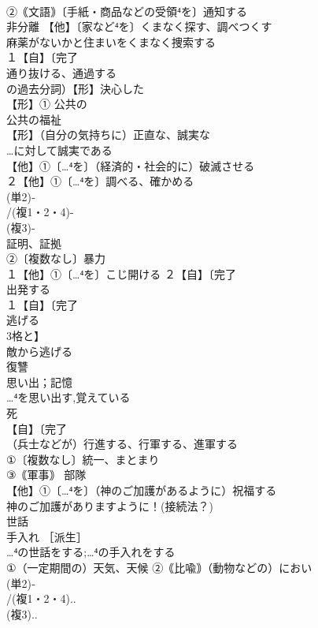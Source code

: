 \documentclass[8pt]{extreport}
\begin{document}
\begin{CJK}{UTF8}{min}
\\	②｟文語｠〔手紙・商品などの受領⁴を〕通知する
\\	非分離 【他】〔家など⁴を〕くまなく探す、調べつくす 
\\	麻薬がないかと住まいをくまなく捜索する
\\	１【自】〔完了
\\	通り抜ける、通過する 
\\	の過去分詞）【形】決心した
\\	【形】① 公共の 
\\	公共の福祉
\\	【形】（自分の気持ちに）正直な、誠実な 
\\	…に対して誠実である 
\\	【他】①〔…⁴を〕（経済的・社会的に）破滅させる 
\\	２【他】①〔…⁴を〕調べる、確かめる
\\	(単2)‐
\\	/(複1・2・4)-
\\	(複3)-
\\	証明、証拠 
\\	②〔複数なし〕暴力
\\	１【他】①〔…⁴を〕こじ開ける ２【自】〔完了
\\	出発する
\\	１【自】〔完了
\\	逃げる 
\\	3格と】
\\	敵から逃げる
\\	復讐 
\\	思い出；記憶 
\\	…⁴を思い出す,覚えている
\\	死 
\\	【自】〔完了
\\	（兵士などが）行進する、行軍する、進軍する 
\\	①〔複数なし〕統一、まとまり 
\\	③｟軍事｠ 部隊
\\	【他】①〔…⁴を〕（神のご加護があるように）祝福する 
\\	神のご加護がありますように！(接続法？)
\\	世話　　
\\	手入れ ［派生］ 
\\	…⁴の世話をする;…⁴の手入れをする
\\	①（一定期間の）天気、天候 ②｟比喩｠（動物などの）におい
\\	(単2)‐
\\	/(複1・2・4)..
\\	(複3)..

\end{CJK}
\end{document}
